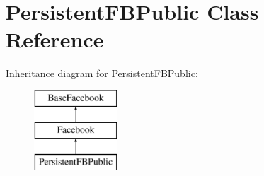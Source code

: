 \hypertarget{class_persistent_f_b_public}{\section{Persistent\-F\-B\-Public Class Reference}
\label{class_persistent_f_b_public}
}
Inheritance diagram for Persistent\-F\-B\-Public\-:\begin{figure}[H]
\begin{center}
\leavevmode
\includegraphics[height=3.000000cm]{class_persistent_f_b_public}
\end{center}
\end{figure}
